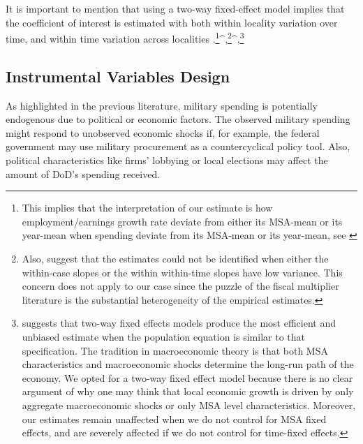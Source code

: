 \documentclass[dv_diss_main.tex]{subfiles}
\begin{document}
It is important to mention that using a two-way fixed-effect model implies that the coefficient of interest is estimated with both within locality variation over time, and within time variation across localities \citep{kropko2020interpretation}.\footnote{This implies that the interpretation of our estimate is how employment/earnings growth rate deviate from either its MSA-mean or its year-mean when spending deviate from its MSA-mean or its year-mean, see \cite{kropko2020interpretation} }^{,}\footnote{Also, \cite{kropko2020interpretation} suggest that the estimates could not be identified when either the within-case slopes or the within within-time slopes have low variance. This concern does not apply to our case since the puzzle of the fiscal multiplier literature is the substantial heterogeneity of the empirical estimates.}^{,}\footnote{
 \cite{kropko2020interpretation} suggests that two-way fixed effects models produce the most efficient and unbiased estimate when the population equation is similar to that specification. The tradition in macroeconomic theory is that both MSA characteristics and macroeconomic shocks determine the long-run path of the economy. We opted for a two-way fixed effect model because there is no clear argument of why one may think that local economic growth is driven by only aggregate macroeconomic shocks or only MSA level characteristics. Moreover, our estimates remain unaffected when we do not control for MSA fixed effects, and are severely affected if we do not control for time-fixed effects.}

\subsection{Instrumental Variables Design}

As highlighted in the previous literature, military spending is potentially endogenous due to political or economic factors. The observed military spending might respond to unobserved economic shocks if, for example, the federal government may use military procurement as a countercyclical policy tool. Also, political characteristics like firms' lobbying or local elections may affect the amount of DoD's spending received. 
\end{document}
